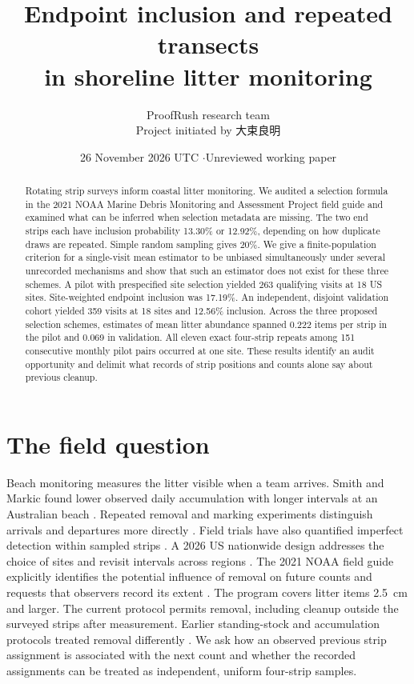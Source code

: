 \documentclass[10pt]{article}
\title{Endpoint inclusion and repeated transects\\ in shoreline litter monitoring}
\author{ProofRush research team\\[-1pt]\small Project initiated by {\namefont 大束良明}}
\date{26 November 2026 UTC \quad$\cdot$\quad Unreviewed working paper}
\makeatletter
\renewcommand{\maketitle}{\begin{center}{\LARGE\@title\par}\vspace{5pt}{\large\@author\par}\vspace{3pt}{\small\@date\par}\end{center}}
\makeatother
\begin{document}
\maketitle
\begin{abstract}
Rotating strip surveys inform coastal litter monitoring. We audited a selection formula in the 2021 NOAA Marine Debris Monitoring and Assessment Project field guide and examined what can be inferred when selection metadata are missing. The two end strips each have inclusion probability 13.30\% or 12.92\%, depending on how duplicate draws are repeated. Simple random sampling gives 20\%. We give a finite-population criterion for a single-visit mean estimator to be unbiased simultaneously under several unrecorded mechanisms and show that such an estimator does not exist for these three schemes. A pilot with prespecified site selection yielded 263 qualifying visits at 18 US sites. Site-weighted endpoint inclusion was 17.19\%. An independent, disjoint validation cohort yielded 359 visits at 18 sites and 12.56\% inclusion. Across the three proposed selection schemes, estimates of mean litter abundance spanned 0.222 items per strip in the pilot and 0.069 in validation. All eleven exact four-strip repeats among 151 consecutive monthly pilot pairs occurred at one site. These results identify an audit opportunity and delimit what records of strip positions and counts alone say about previous cleanup.
\end{abstract}

\section{The field question}
Beach monitoring measures the litter visible when a team arrives. Smith and Markic found lower observed daily accumulation with longer intervals at an Australian beach \cite{smith}. Repeated removal and marking experiments distinguish arrivals and departures more directly \cite{willis,haarr}. Field trials have also quantified imperfect detection within sampled strips \cite{detection}. A 2026 US nationwide design addresses the choice of sites and revisit intervals across regions \cite{nationwide}. The 2021 NOAA field guide explicitly identifies the potential influence of removal on future counts and requests that observers record its extent \cite{guide}. The program covers litter items 2.5~cm and larger. The current protocol permits removal, including cleanup outside the surveyed strips after measurement. Earlier standing-stock and accumulation protocols treated removal differently \cite{sanctuary}. We ask how an observed previous strip assignment is associated with the next count and whether the recorded assignments can be treated as independent, uniform four-strip samples.
\end{document}
